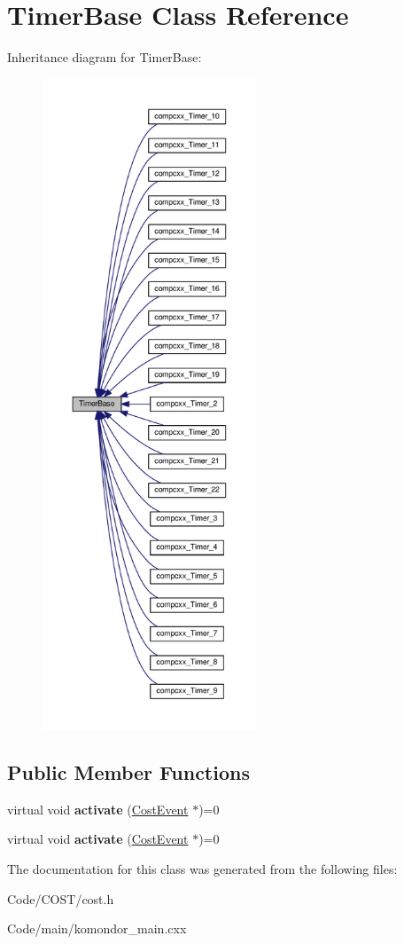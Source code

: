 \hypertarget{classTimerBase}{}\section{Timer\+Base Class Reference}
\label{classTimerBase}


Inheritance diagram for Timer\+Base\+:\nopagebreak
\begin{figure}[H]
\begin{center}
\leavevmode
\includegraphics[height=550pt]{classTimerBase__inherit__graph}
\end{center}
\end{figure}
\subsection*{Public Member Functions}
\begin{DoxyCompactItemize}
\item 
\mbox{\label{classTimerBase_a956db99eb35606b626ee41a703849b1f}} 
virtual void {\bfseries activate} (\hyperlink{structCostEvent}{Cost\+Event} $\ast$)=0
\item 
\mbox{\label{classTimerBase_a956db99eb35606b626ee41a703849b1f}} 
virtual void {\bfseries activate} (\hyperlink{structCostEvent}{Cost\+Event} $\ast$)=0
\end{DoxyCompactItemize}


The documentation for this class was generated from the following files\+:\begin{DoxyCompactItemize}
\item 
Code/\+C\+O\+S\+T/cost.\+h\item 
Code/main/komondor\+\_\+main.\+cxx\end{DoxyCompactItemize}
